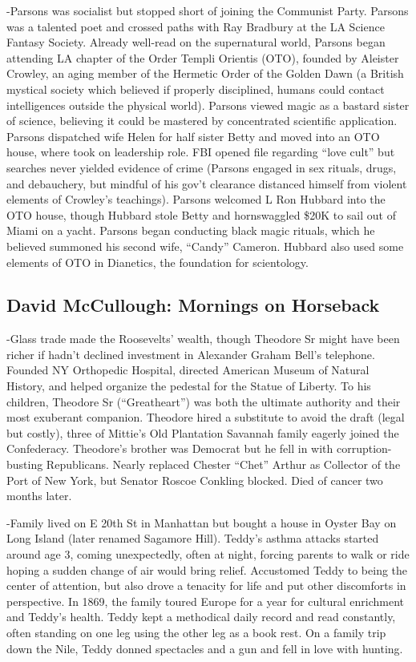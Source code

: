 \documentclass[
]{article}
\begin{document}
-Parsons was socialist but stopped short of joining the Communist Party.
Parsons was a talented poet and crossed paths with Ray Bradbury at the
LA Science Fantasy Society. Already well-read on the supernatural world,
Parsons began attending LA chapter of the Order Templi Orientis (OTO),
founded by Aleister Crowley, an aging member of the Hermetic Order of
the Golden Dawn (a British mystical society which believed if properly
disciplined, humans could contact intelligences outside the physical
world). Parsons viewed magic as a bastard sister of science, believing
it could be mastered by concentrated scientific application. Parsons
dispatched wife Helen for half sister Betty and moved into an OTO house,
where took on leadership role. FBI opened file regarding ``love cult''
but searches never yielded evidence of crime (Parsons engaged in sex
rituals, drugs, and debauchery, but mindful of his gov't clearance
distanced himself from violent elements of Crowley's teachings). Parsons
welcomed L Ron Hubbard into the OTO house, though Hubbard stole Betty
and hornswaggled \$20K to sail out of Miami on a yacht. Parsons began
conducting black magic rituals, which he believed summoned his second
wife, ``Candy'' Cameron. Hubbard also used some elements of OTO in
Dianetics, the foundation for scientology.

\hypertarget{david-mccullough-mornings-on-horseback}{%
\subsection{David McCullough: Mornings on
Horseback}\label{david-mccullough-mornings-on-horseback}}

-Glass trade made the Roosevelts' wealth, though Theodore Sr might have
been richer if hadn't declined investment in Alexander Graham Bell's
telephone. Founded NY Orthopedic Hospital, directed American Museum of
Natural History, and helped organize the pedestal for the Statue of
Liberty. To his children, Theodore Sr (``Greatheart'') was both the
ultimate authority and their most exuberant companion. Theodore hired a
substitute to avoid the draft (legal but costly), three of Mittie's Old
Plantation Savannah family eagerly joined the Confederacy. Theodore's
brother was Democrat but he fell in with corruption-busting Republicans.
Nearly replaced Chester ``Chet'' Arthur as Collector of the Port of New
York, but Senator Roscoe Conkling blocked. Died of cancer two months
later.

-Family lived on E 20th St in Manhattan but bought a house in Oyster Bay
on Long Island (later renamed Sagamore Hill). Teddy's asthma attacks
started around age 3, coming unexpectedly, often at night, forcing
parents to walk or ride hoping a sudden change of air would bring
relief. Accustomed Teddy to being the center of attention, but also
drove a tenacity for life and put other discomforts in perspective. In
1869, the family toured Europe for a year for cultural enrichment and
Teddy's health. Teddy kept a methodical daily record and read
constantly, often standing on one leg using the other leg as a book
rest. On a family trip down the Nile, Teddy donned spectacles and a gun
and fell in love with hunting.
\end{document}
